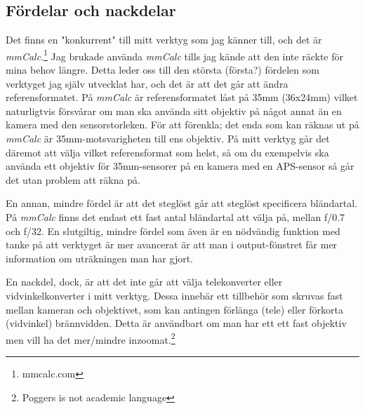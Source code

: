 \documentclass[11pt]{article}
\begin{document}
\subsection{Fördelar och nackdelar}
Det finns en "konkurrent" till mitt verktyg som jag känner till, och det är
\emph{mmCalc}.\footnote{mmcalc.com} Jag brukade använda \emph{mmCalc} tills
jag kände att den inte räckte för mina behov längre. Detta leder oss till den
största {(första?)} fördelen som verktyget jag själv utvecklat har, och det
är att det går att ändra referensformatet. På \emph{mmCalc} är
referensformatet låst på 35mm (36x24mm) vilket naturligtvis försvårar om man
ska använda sitt objektiv på något annat än en kamera med den sensorstorleken.
För att förenkla; det enda som kan räknas ut på \emph{mmCalc} är
35mm-motsvarigheten till ens objektiv. På mitt verktyg går det däremot att välja
vilket referensformat som helst, så om du exempelvis ska använda ett objektiv
för 35mm-sensorer på en kamera med en APS-sensor så går det utan problem att
räkna på. \par
En annan, mindre fördel är att det steglöst går att steglöst
specificera bländartal. På \emph{mmCalc} finns det endast ett fast antal
bländartal att välja på, mellan f/0.7 och f/32. En slutgiltig, mindre fördel
som även är en nödvändig funktion med tanke på att verktyget är mer avancerat
är att man i output-fönstret får mer information om uträkningen man har gjort.
\par

En nackdel, dock, är att det inte går att välja telekonverter eller 
vidvinkelkonverter i mitt verktyg. Dessa innebär ett tillbehör som skruvas
fast mellan kameran och objektivet, som kan antingen förlänga (tele) eller
förkorta (vidvinkel) brännvidden. Detta är användbart om man har ett ett fast
objektiv men vill ha det mer/mindre inzoomat.\footnote{Poggers is not academic
language}\par

\bigskip
\fussy

\bigskip
\bigskip
\bigskip
\bigskip

\end{document}
